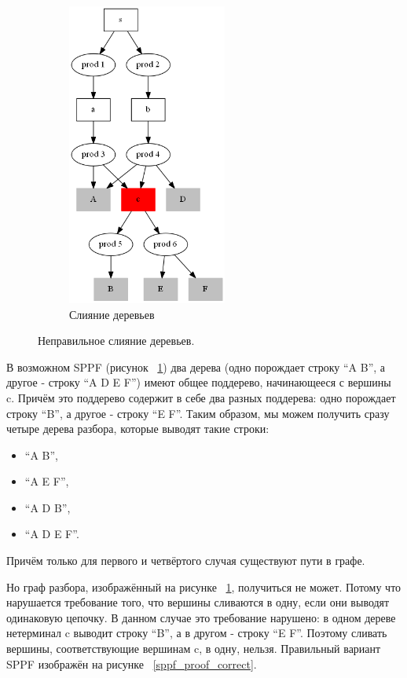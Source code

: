 \begin{figure}[h]
\begin{subfigure}{0.25\textwidth}
        \includegraphics[height=100mm]{Pictures/SPPF_proof_incorrect.png}
        \caption*{Слияние деревьев}
    \end{subfigure}
\caption{Неправильное слияние деревьев.}
\label{sppf_proof_incorrect}
\end{figure}

В возможном SPPF (рисунок ~\ref{sppf_proof_incorrect}) два дерева (одно порождает строку “A B”, а другое - строку “A D E F”) имеют общее поддерево, начинающееся с вершины c. Причём это поддерево содержит в себе два разных поддерева: одно порождает строку “B”, а другое - строку “E F”. Таким образом, мы можем получить сразу четыре дерева разбора, которые выводят такие строки:
\begin{itemize}
\item “A B”,
\item “A E F”,
\item “A D B”,
\item “A D E F”.
\end{itemize}

Причём только для первого и четвёртого случая существуют пути в графе. 

Но граф разбора, изображённый на рисунке ~\ref{sppf_proof_incorrect}, получиться не может. Потому что нарушается требование того, что вершины сливаются в одну, если они выводят одинаковую цепочку. В данном случае это требование нарушено: в одном дереве нетерминал c выводит строку “B”, а в другом - строку “E F”. Поэтому сливать вершины, соответствующие вершинам c, в одну, нельзя. Правильный вариант SPPF изображён на рисунке ~\ref{sppf_proof_correct}.

